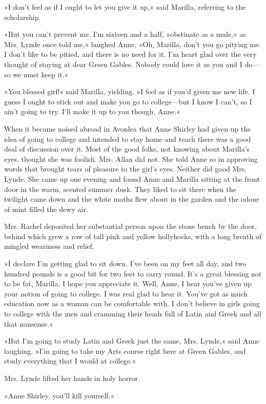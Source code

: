 »I don’t feel as if I ought to let you give it up,« said Marilla, referring to the scholarship.

»But you can’t prevent me. I’m sixteen and a half, »obstinate as a mule,« as Mrs. Lynde once told me,« laughed Anne. »Oh, Marilla, don’t you go pitying me. I don’t like to be pitied, and there is no need for it. I’m heart glad over the very thought of staying at dear Green Gables. Nobody could love it as you and I do—so we must keep it.«

»You blessed girl!« said Marilla, yielding. »I feel as if you’d given me new life. I guess I ought to stick out and make you go to college—but I know I can’t, so I ain’t going to try. I’ll make it up to you though, Anne.«

When it became noised abroad in Avonlea that Anne Shirley had given up the idea of going to college and intended to stay home and teach there was a good deal of discussion over it. Most of the good folks, not knowing about Marilla’s eyes, thought she was foolish. Mrs. Allan did not. She told Anne so in approving words that brought tears of pleasure to the girl’s eyes. Neither did good Mrs. Lynde. She came up one evening and found Anne and Marilla sitting at the front door in the warm, scented summer dusk. They liked to sit there when the twilight came down and the white moths flew about in the garden and the odour of mint filled the dewy air.

Mrs. Rachel deposited her substantial person upon the stone bench by the door, behind which grew a row of tall pink and yellow hollyhocks, with a long breath of mingled weariness and relief.

»I declare I’m getting glad to sit down. I’ve been on my feet all day, and two hundred pounds is a good bit for two feet to carry round. It’s a great blessing not to be fat, Marilla. I hope you appreciate it. Well, Anne, I hear you’ve given up your notion of going to college. I was real glad to hear it. You’ve got as much education now as a woman can be comfortable with. I don’t believe in girls going to college with the men and cramming their heads full of Latin and Greek and all that nonsense.«

»But I’m going to study Latin and Greek just the same, Mrs. Lynde,« said Anne laughing. »I’m going to take my Arts course right here at Green Gables, and study everything that I would at college.«

Mrs. Lynde lifted her hands in holy horror.

»Anne Shirley, you’ll kill yourself.«

